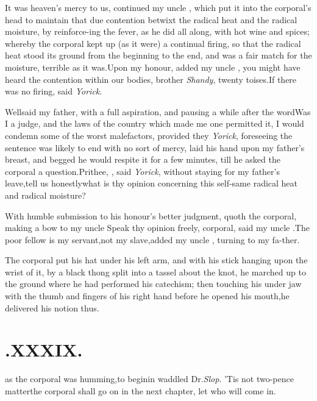 \documentclass[twoside]{article}
\begin{document}
\tsh  It was heaven’s mercy to us, continued my
uncle \toby, which put it into the corporal’s head to
maintain that due contention betwixt the radical heat and the
radical moisture, by reinforce-\break ing the fever, as he did all along,
with hot wine and spices; whereby the corporal kept up (as it were)
a continual firing, so that the radical heat stood its ground from
the beginning to the end, and was a fair match for the moisture,
terrible as it was.\tsh Upon my honour, added my uncle
\toby, you might have heard the contention within our bodies,
brother \textit{Shandy}, twenty toises.\tsk If there was no firing,
said \textit{Yorick}.

Well\tsk said my father, with a full aspiration, and pausing a while after
the word\tsh Was I a judge, and the laws\break
of the country which made me one\break
permitted it, I would condemn some of\break
the worst malefactors, provided they
\break
\tsh \textit{Yorick}, foreseeing the sentence was likely to end
with no sort of mercy, laid his hand upon my father’s breast,
and begged he would respite it for a few minutes, till he asked
the corporal a question.\tsh Prithee, \trim, said
\textit{Yorick}, without staying for my father’s
leave,\tsk\break tell
us honestly\tsk what is thy opinion\break
concerning this self-same radical heat\break
and radical moisture?

With humble submission to his ho\-nour’s better judgment,
quoth the cor\-poral, making a bow to my uncle \toby
\tsk Speak thy opinion freely, corporal,\break 
said my uncle \toby.\tsk The poor fellow\break
is my servant,\tsk not my slave,\tsk added\break
my uncle \toby, turning to my fa-\break ther.\tsh{}

The corporal put his hat under his\break
left arm, and with his stick hanging\break
upon the wrist of it, by a black thong\break
split into a tassel about the knot,\break
he marched up to the ground where he\break
had performed his catechism; then\break
touching his under jaw with the thumb\break
and fingers of his right hand before he\break
opened his mouth,\tsh he delivered his\break
notion thus.


\section{.\enspace  XXXIX.}

\baselineskip

 as the corporal was humming,\break to
begin\tsk in waddled Dr.\@ \textit{Slop}.\tsk\break
’Tis not two-pence matter\tsk the corporal shall go on in the next
chapter, let who will come in.\tsh
\end{document}
